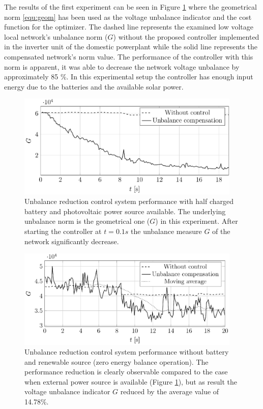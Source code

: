             The results of the first experiment can be seen in Figure \ref{fig:compare_asym_PV} where the geometrical norm \ref{equ:geom} has been used as the voltage unbalance indicator and the cost function for the optimizer.  The dashed line represents the examined low voltage local network's unbalance norm ($G$) without the proposed controller implemented in the inverter unit of the domestic powerplant while the solid line represents the compensated network's norm value. The performance of the controller with this norm is apparent, it was able to decrease the network voltage unbalance by approximately 85 \%. In this experimental setup the controller has enough input energy due to the batteries and the available solar power.

            \begin{figure}[ht]
            \centering
            \includegraphics[width=0.95\textwidth]{Unblance_EPS_Pics/UnbalRedComp_JCP-figure3.eps}
            \caption{Unbalance reduction control system performance with half charged battery and photovoltaic power source available. The underlying unbalance norm is the geometrical one ($G$) in this experiment. After starting the controller at $t=0.1s$ the unbalance measure $G$ of the network significantly decrease.}
            \label{fig:compare_asym_PV}
            \end{figure}

            \begin{figure}[ht]
            \centering
            \includegraphics[width=0.95\textwidth]{Unblance_EPS_Pics/UnbalRedComp_JCP-figure4.eps}
            \caption{Unbalance reduction control system performance without battery and renewable source (zero energy balance operation). The performance reduction is clearly observable compared to the case when external power source is available (Figure \ref{fig:compare_asym_PV}), but as result the voltage unbalance indicator $G$ reduced by the average value of 14.78\%.}
            \label{fig:compare_asym}
            \end{figure}

